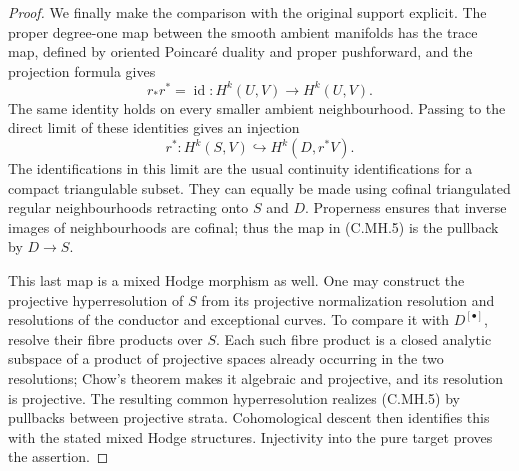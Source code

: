\begin{proof}
We finally make the comparison with the original
support explicit. The proper degree-one map between
the smooth ambient manifolds has the trace map, defined
by oriented Poincar\'e duality and proper pushforward,
and the projection formula gives
\[
 r_*r^*=\operatorname{id}:H^k(U,V)\longrightarrow H^k(U,V).
 \tag{C.MH.4}
\]
The same identity holds on every smaller ambient
neighbourhood. Passing to the direct limit of these
identities gives an injection
\[
                  r^*:H^k(S,V)\hookrightarrow H^k(D,r^*V).
 \tag{C.MH.5}
\]
The identifications in this limit are the usual
continuity identifications for a compact triangulable
subset. They can equally be made using cofinal
triangulated regular neighbourhoods retracting onto
$S$ and $D$. Properness ensures that inverse images of
neighbourhoods are cofinal; thus the map in (C.MH.5)
is the pullback by $D\to S$.

This last map is a mixed Hodge morphism as well. One
may construct the projective hyperresolution of $S$
from its projective normalization resolution and
resolutions of the conductor and exceptional curves.
To compare it with $D^{[\bullet]}$, resolve their
fibre products over $S$. Each such fibre product is a
closed analytic subspace of a product of projective
spaces already occurring in the two resolutions;
Chow's theorem makes it algebraic and projective,
and its resolution is projective. The resulting
common hyperresolution realizes (C.MH.5) by pullbacks
between projective strata. Cohomological descent then
identifies this with the stated mixed Hodge structures.
Injectivity into the pure target proves the assertion.
\end{proof}




